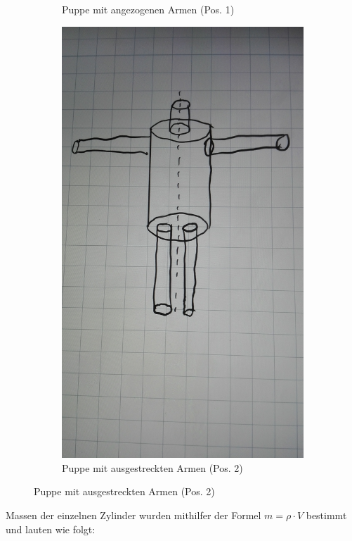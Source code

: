 \begin{figure}[H]
\begin{subfigure}{0.495\linewidth}
\caption{Puppe mit angezogenen Armen (Pos. 1)}
\end{subfigure}
\begin{subfigure}{0.495\linewidth}
\centering
\includegraphics[width=\textwidth]{images/puppe_aus.jpg}
\caption{Puppe mit ausgestreckten Armen (Pos. 2)}
\end{subfigure}
\end{figure}

\justifying Massen der einzelnen Zylinder wurden mithilfer der Formel $m= \rho \cdot V$ bestimmt und lauten wie folgt:

